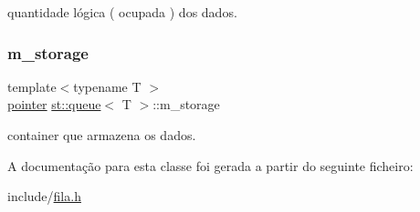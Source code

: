 quantidade lógica ( ocupada ) dos dados. 

\mbox{\label{classst_1_1queue_a1e4db9739dd6b27927a710c0e52d4f10}} 
\subsubsection{\texorpdfstring{m\+\_\+storage}{m\_storage}}
{\footnotesize\ttfamily template$<$typename T $>$ \\
\hyperlink{classst_1_1queue_ad60e399108ab295c2800f2c415c84de4}{pointer} \hyperlink{classst_1_1queue}{st\+::queue}$<$ T $>$\+::m\+\_\+storage\hspace{0.3cm}{\ttfamily [private]}}



container que armazena os dados. 



A documentação para esta classe foi gerada a partir do seguinte ficheiro\+:\begin{DoxyCompactItemize}
\item 
include/\hyperlink{fila_8h}{fila.\+h}\end{DoxyCompactItemize}

